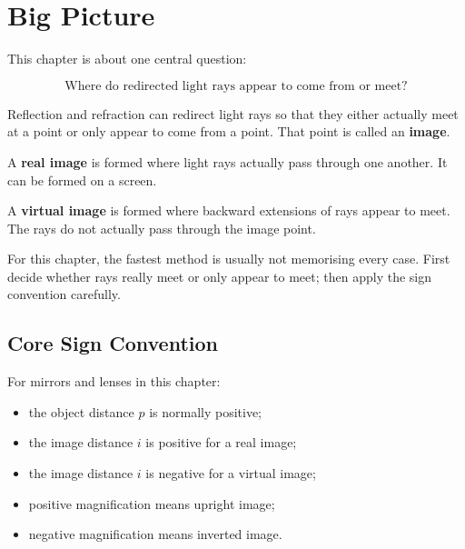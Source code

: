 \documentclass{studentnotes}
\begin{document}
\makenotetitle

\tableofcontents
\newpage

\section{Big Picture}

This chapter is about one central question:

\[
    \boxed{\text{Where do redirected light rays appear to come from or meet?}}
\]

Reflection and refraction can redirect light rays so that they either actually
meet at a point or only appear to come from a point. That point is called an
\textbf{image}.

\begin{definition}
    A \textbf{real image} is formed where light rays actually pass through one
    another. It can be formed on a screen.
\end{definition}

\begin{definition}
    A \textbf{virtual image} is formed where backward extensions of rays appear
    to meet. The rays do not actually pass through the image point.
\end{definition}

\begin{importantnote}
    For this chapter, the fastest method is usually not memorising every case.
    First decide whether rays really meet or only appear to meet; then apply the
    sign convention carefully.
\end{importantnote}

\subsection{Core Sign Convention}

For mirrors and lenses in this chapter:

\begin{itemize}
    \item the object distance \(p\) is normally positive;
    \item the image distance \(i\) is positive for a real image;
    \item the image distance \(i\) is negative for a virtual image;
    \item positive magnification means upright image;
    \item negative magnification means inverted image.
\end{itemize}
\end{document}
